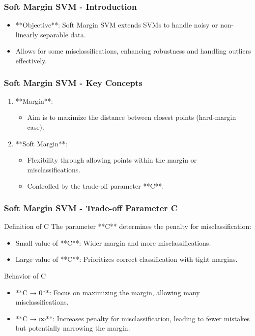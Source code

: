 \documentclass{beamer}
\begin{document}
\begin{frame}[fragile]
    \frametitle{Soft Margin SVM - Introduction}
    \begin{itemize}
        \item **Objective**: Soft Margin SVM extends SVMs to handle noisy or non-linearly separable data.
        \item Allows for some misclassifications, enhancing robustness and handling outliers effectively.
    \end{itemize}
\end{frame}

\begin{frame}[fragile]
    \frametitle{Soft Margin SVM - Key Concepts}
    \begin{enumerate}
        \item **Margin**: 
        \begin{itemize}
            \item Aim is to maximize the distance between closest points (hard-margin case).
        \end{itemize}
        
        \item **Soft Margin**:
        \begin{itemize}
            \item Flexibility through allowing points within the margin or misclassifications.
            \item Controlled by the trade-off parameter **C**.
        \end{itemize}
    \end{enumerate}
\end{frame}

\begin{frame}[fragile]
    \frametitle{Soft Margin SVM - Trade-off Parameter C}
    \begin{block}{Definition of C}
        The parameter **C** determines the penalty for misclassification:
        \begin{itemize}
            \item Small value of **C**: Wider margin and more misclassifications.
            \item Large value of **C**: Prioritizes correct classification with tight margins.
        \end{itemize}
    \end{block}

    \begin{block}{Behavior of C}
        \begin{itemize}
            \item **C → 0**: Focus on maximizing the margin, allowing many misclassifications.
            \item **C → ∞**: Increases penalty for misclassification, leading to fewer mistakes but potentially narrowing the margin.
        \end{itemize}
    \end{block}
\end{frame}
\end{document}
